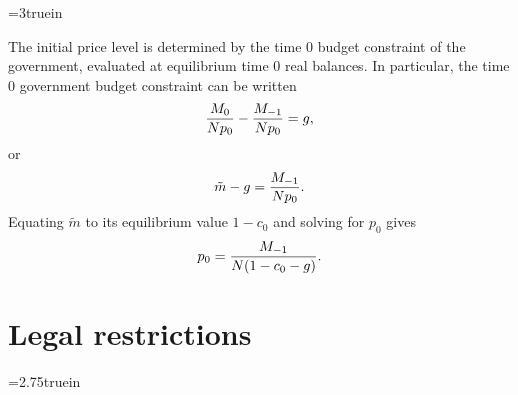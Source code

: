 

\centerline{\epsfxsize=3truein}
\caption{Demand for real balances on the $y$-axis as a function of the gross
rate of return on currency on the $x$-axis when $\beta =.95, \delta =2.$}
\endfigure


The initial price level is determined by the time $0$ budget constraint of the
government, evaluated at equilibrium time $0$ real balances.  In particular,
the time $0$ government budget constraint can be written
$$ {M_0 \over N p_0} - {M_{-1} \over N p_0} = g,$$
or
$$ \tilde m - g = {M_{-1} \over N p_0} .$$
Equating $\tilde m$ to its equilibrium value $1-c_0$ and solving
for $p_0$ gives
$$ p_0 = {M_{-1} \over N (1 - c_0 - g)}.$$
\section{Legal restrictions}

\centerline{\epsfxsize=2.75truein}
\caption{The budget line starting at $(1,0)$ and ending at the point $B$
describes an odd agent's time $0$ opportunities in an equilibrium with
inflationary finance.  Because this equilibrium has the ``private
consumption feasibility menu'' intersecting the odd agent's indifference
curve, a ``forced saving'' legal restriction can be used to put the odd
agent onto a higher indifference curve than $I$, while leaving even agents
better off and the government with revenue $g$. If the individual is
confronted with a minimum denomination $F$ at the rate of return associated
with the budget line ending at $H$, he would choose to consume $1-F$.}
\endfigure


